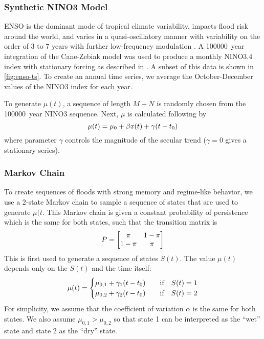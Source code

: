 \documentclass[12pt]{article}
\begin{document}
\subsubsection{Synthetic NINO3 Model\label{sec:methods-nino}}

ENSO is the dominant mode of tropical climate variability, impacts flood risk around the world, and varies in a quasi-oscillatory manner with variability on the order of 3 to 7 years with further low-frequency modulation \citep{Sarachik2010}.
A \SI{100000}{year} integration of the Cane-Zebiak model \citep{Zebiak1987} was used to produce a monthly NINO3.4 index with stationary forcing as described in \citet{Ramesh2017}.
A subset of this data is shown in \cref{fig:enso-ts}.
To create an annual time series, we average the October-December values of the NINO3 index for each year.

To generate \(\mu(t)\), a sequence of length \(M+N\) is randomly chosen from the \SI{100000}{year} NINO3 sequence.
Next, \(\mu\) is calculated following by
\begin{equation}
  \mu(t) = \mu_0 + \beta x(t) + \gamma \qty(t - t_0)
\end{equation}
where parameter \(\gamma\) controls the magnitude of the secular trend (\(\gamma=0\) gives a stationary series).

\subsubsection{Markov Chain\label{sec:methods-markov}}

To create sequences of floods with strong memory and regime-like behavior, we use a 2-state Markov chain to sample a sequence of states that are used to generate \(\mu(t\).
This Markov chain is given a constant probability of persistence which is the same for both states, such that the transition matrix is
\begin{equation*}
  P = \mqty[\pi & 1-\pi \\ 1-\pi & \pi]
\end{equation*}
This is first used to generate a sequence of states \(S(t)\).
The value \( \mu(t) \) depends only on the \(S(t)\) and the time itself:
\begin{equation*}
  \mu(t) = \begin{cases}
    \mu_{0,1} + \gamma_1 \qty(t - t_0) & \qqtext{if} S(t) = 1 \\
    \mu_{0,2} + \gamma_2 \qty(t - t_0) & \qqtext{if} S(t) = 2
  \end{cases}
\end{equation*}
For simplicity, we assume that the coefficient of variation \( \alpha \) is the same for both states.
We also assume \( \mu_{0, 1} > \mu_{0, 2} \) so that state 1 can be interpreted as the ``wet'' state and state 2 as the ``dry'' state.
\end{document}
